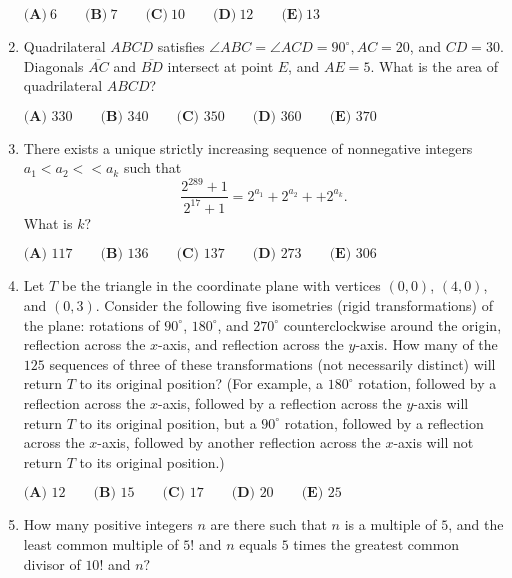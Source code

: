 \documentclass{article}
\begin{document}
\begin{enumerate}[label=\arabic*., itemsep=0.5em]
\(\textbf{(A)}\ 6\qquad\textbf{(B)}\ 7\qquad\textbf{(C)}\ 10\qquad\textbf{(D)}\ 12\qquad\textbf{(E)}\ 13\)\par \vspace{0.5em}\item Quadrilateral \(ABCD\) satisfies \(\angle ABC = \angle ACD = 90^{\circ}, AC = 20\), and \(CD = 30\). Diagonals \(\overline{AC}\) and \(\overline{BD}\) intersect at point \(E\), and \(AE = 5\). What is the area of quadrilateral \(ABCD\)?

\(\textbf{(A) } 330 \qquad\textbf{(B) } 340 \qquad\textbf{(C) } 350 \qquad\textbf{(D) } 360 \qquad\textbf{(E) } 370\)\par \vspace{0.5em}\item There exists a unique strictly increasing sequence of nonnegative integers \(a_1 < a_2 <  < a_k\) such that
\begin{equation*}
\frac{2^{289}+1}{2^{17}+1} = 2^{a_1} + 2^{a_2} +  + 2^{a_k}.
\end{equation*}
What is \(k?\)

\(\textbf{(A) } 117 \qquad \textbf{(B) } 136 \qquad \textbf{(C) } 137 \qquad \textbf{(D) } 273 \qquad \textbf{(E) } 306\)\par \vspace{0.5em}\item Let \(T\) be the triangle in the coordinate plane with vertices \(\left(0,0\right)\), \(\left(4,0\right)\), and \(\left(0,3\right)\). Consider the following five isometries (rigid transformations) of the plane: rotations of \(90^{\circ}\), \(180^{\circ}\), and \(270^{\circ}\) counterclockwise around the origin, reflection across the \(x\)-axis, and reflection across the \(y\)-axis. How many of the \(125\) sequences of three of these transformations (not necessarily distinct) will return \(T\) to its original position? (For example, a \(180^{\circ}\) rotation, followed by a reflection across the \(x\)-axis, followed by a reflection across the \(y\)-axis will return \(T\) to its original position, but a \(90^{\circ}\) rotation, followed by a reflection across the \(x\)-axis, followed by another reflection across the \(x\)-axis will not return \(T\) to its original position.)

\(\textbf{(A) } 12\qquad\textbf{(B) } 15\qquad\textbf{(C) }17 \qquad\textbf{(D) }20 \qquad\textbf{(E) }25\)\par \vspace{0.5em}\item How many positive integers \(n\) are there such that \(n\) is a multiple of \(5\), and the least common multiple of \(5!\) and \(n\) equals \(5\) times the greatest common divisor of \(10!\) and \(n?\)


\end{enumerate}
\end{document}
